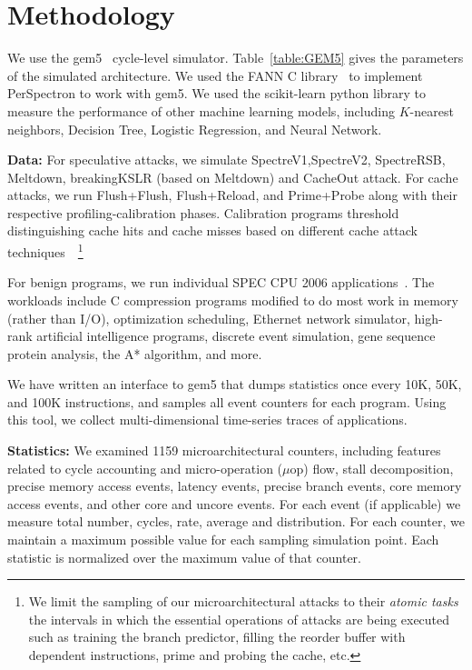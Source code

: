 \section{Methodology}\label{method}
We use the gem5~\cite{gem5} cycle-level simulator.
Table~\ref{table:GEM5} gives the parameters of the simulated architecture. 
We used the FANN C library~\cite{FANNnissen03} to implement PerSpectron to 
work with gem5. We used the scikit-learn python library to measure the performance 
of other machine learning models, including $K$-nearest neighbors, Decision Tree, 
Logistic Regression, and Neural Network. 


\noindent\textbf{Data:}  
For speculative attacks, we simulate SpectreV1,SpectreV2, SpectreRSB, 
Meltdown, breakingKSLR (based on Meltdown) and CacheOut attack. For cache 
attacks, we run Flush+Flush, Flush+Reload, and Prime+Probe along with their 
respective profiling-calibration phases. Calibration programs threshold distinguishing 
cache hits and cache misses based on different cache attack techniques~\cite{PrimeProbe2015last,FlushReload2014Yarom, GrussFlushFlush}~\footnote{We limit the sampling of our microarchitectural attacks to their {\em atomic tasks} the intervals in which the essential operations of attacks are being executed such as training the branch predictor, filling the reorder buffer with dependent instructions, prime and probing the cache, etc.  
}
 
 
For benign programs, we run individual SPEC CPU 2006 applications~\cite{spec2006}. 
The workloads include C compression programs modified to do most work in memory 
(rather than I/O), optimization scheduling, Ethernet network simulator, high-rank 
artificial intelligence programs, discrete event simulation, gene sequence protein 
analysis, the A* algorithm, and more. 
 
We have written an interface to gem5 that dumps statistics once every 10K, 50K, and 100K 
instructions, and samples all event counters for each program. Using this tool, we 
collect multi-dimensional time-series traces of applications.

\noindent \textbf{Statistics:}
We examined 1159 microarchitectural counters, including features related to 
cycle accounting and micro-operation ($\mu$op) flow, stall decomposition, 
precise memory access events, latency events, precise branch events, core memory 
access events, and other core and uncore events. 
For each event (if applicable) we measure total number, cycles, rate, average and distribution. 
For each counter, we maintain a maximum possible value for each sampling simulation point. 
Each statistic is normalized over the maximum value of that counter.

